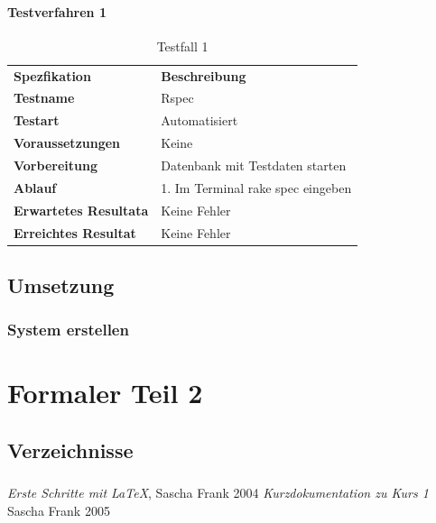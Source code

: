 \documentclass{report}
\makeatletter
\renewcommand\listoftables{%
    \section{\listtablename}%
    \@mkboth{\MakeUppercase\listtablename}%
        {\MakeUppercase\listtablename}%
    \@starttoc{lot}%
}
\renewcommand\listoffigures{%
    \section{\listfigurename}%
    \@mkboth{\MakeUppercase\listfigurename}%
        {\MakeUppercase\listfigurename}%
    \@starttoc{lof}%
}
\makeatother
\begin{document}
\subsection{Testverfahren 1}
\begin{table}[H]
    \begin{tabular}{|l|l|}
        \hline
        \rowcolor{puzzleblue} \multicolumn{2}{|l|}{Testfall Nr. 1}  \\[10pt]
        \hline
        \textbf{Spezfikation} & \textbf{Beschreibung} \\
        \hline
        \rowcolor{puzzleblue!25}\textbf{Testname} & Rspec \\
        \hline
        \textbf{Testart} & Automatisiert \\
        \hline
        \rowcolor{puzzleblue!25}\textbf{Voraussetzungen} & Keine \\
        \hline
        \textbf{Vorbereitung} & Datenbank mit Testdaten starten \\
        \hline
        \rowcolor{puzzleblue!25}\textbf{Ablauf} & 1. Im Terminal rake spec eingeben \\
        \hline
        \textbf{Erwartetes Resultata} & Keine Fehler \\
        \hline
        \rowcolor{puzzleblue!25}\textbf{Erreichtes Resultat} & Keine Fehler \\
        \hline
    \end{tabular}
    \caption{Testfall 1}
\end{table}
\chapter{Umsetzung}
\section{System erstellen}

\part{Formaler Teil 2}

\chapter{Verzeichnisse}
\listoftables
\listoffigures
\begin{thebibliography}{9}
     \emph{Erste Schritte mit \LaTeX},
    Sascha Frank 2004
     \emph{Kurzdokumentation zu Kurs 1}
    Sascha Frank 2005 
\end{thebibliography}
\end{document}
